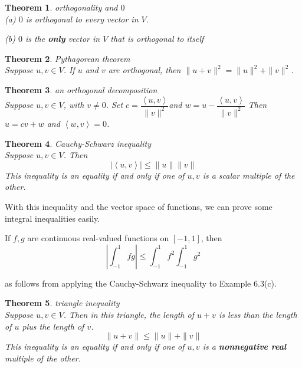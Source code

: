\documentclass{article}
\newtheorem{theorem}{Theorem}[subsection]
\begin{document}
\begin{CJK}{UTF8}{gkai}
\begin{theorem}
    orthogonality and $0$\\

    (a) $0$ is orthogonal to every vector in $V$.

    (b) $0$ is the \textbf{only} vector in $V$ that is orthogonal to itself
\end{theorem}

\begin{theorem}
    Pythagorean theorem\\

    Suppose $u,v \in V$. If $u$ and $v$ are orthogonal, then $\|u +v\|^2 = \|u\|^2 +\|v\|^2$.
\end{theorem}

\begin{theorem}
    an orthogonal decomposition\\

    Suppose $u,v \in V$, with $v \neq 0$. Set $c = \dfrac{\left<u,v\right>}{\|v\|^2}$and $w = u -  \dfrac{\left<u,v\right>}{\|v\|^2}$ Then $u =cv+w$ and $\left<w,v\right>=0$.
\end{theorem}

\begin{theorem}
    Cauchy-Schwarz inequality\\

    Suppose $u,v \in V$. Then
    \[|\left<u, v\right>| \leq \|u\|\|v\|\]
    This inequality is an equality if and only if one of $u,v$ is a scalar multiple of the other.
\end{theorem}

With this inequality and the vector space of functions, we can prove some integral inequalities easily.


If $f,g$ are continuous real-valued functions on $[-1,1]$, then
\[\left|\int_{-1}^{1}fg\right| \leq {\int_{-1}^{1}f^2}{\int_{-1}^{1}g^2}\]

as follows from applying the Cauchy-Schwarz inequality to Example 6.3(c).

\begin{theorem}
    triangle inequality\\

    Suppose $u,v \in V$. Then in this triangle, the length of $u +v$ is less than the length of $u$ plus the length of $v$.
    \[\|u +v\| \leq \|u\|+\|v\|\]
    This inequality is an equality if and only if one of $u,v$ is a \textbf{nonnegative real} multiple of the other.
\end{theorem}


\end{CJK}
\end{document}
